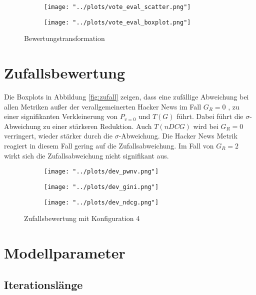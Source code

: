 \begin{figure}[!h]
	\label{fig:trans}	
	\begin{subfigure}{0.5\textwidth}
		\texttt{[image: "../plots/vote\_eval\_scatter.png"]}
	\end{subfigure}
	\begin{subfigure}{0.5\textwidth}
		\texttt{[image: "../plots/vote\_eval\_boxplot.png"]}
	\end{subfigure}
	\caption{Bewertungstransformation}
\end{figure}


\section{Zufallsbewertung}


Die Boxplots in Abbildung \ref{fig:zufall} zeigen, dass eine zufällige Abweichung bei allen Metriken außer der verallgemeinerten Hacker News im Fall $G_R = 0$ , zu einer signifikanten Verkleinerung von $P_{v=0}$ und $T(G)$ führt. Dabei führt die $\sigma$-Abweichung zu einer stärkeren Reduktion. Auch $T(nDCG)$ wird bei $G_R = 0$ verringert, wieder stärker durch die $\sigma$-Abweichung. Die Hacker News Metrik reagiert in diesem Fall gering auf die Zufallsabweichung. Im Fall von $G_R = 2$ wirkt sich die Zufallsabweichung nicht signifikant aus.

\begin{figure}[!h]
	\label{fig:zufall}	
	\begin{subfigure}{0.5\textwidth}
		\texttt{[image: "../plots/dev\_pwnv.png"]}
	\end{subfigure}
	\begin{subfigure}{0.5\textwidth}
		\texttt{[image: "../plots/dev\_gini.png"]}
	\end{subfigure}
	\begin{subfigure}{0.5\textwidth}
		\texttt{[image: "../plots/dev\_ndcg.png"]}
	\end{subfigure}
	\caption{Zufallsbewertung mit Konfiguration 4}
\end{figure}


\section{Modellparameter}

\subsection{Iterationslänge}

